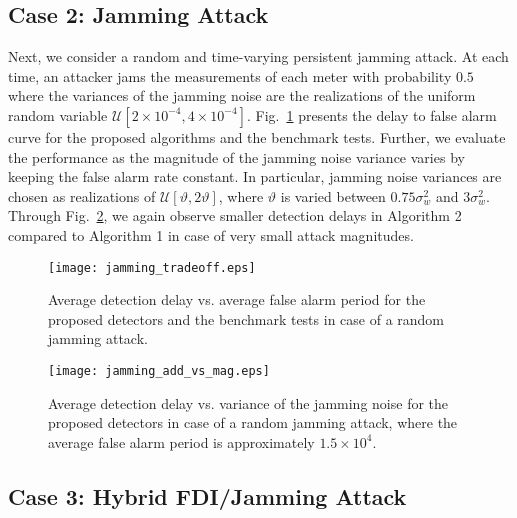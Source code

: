 \documentclass[onecolumn]{IEEEtran}
\begin{document}
\subsection{Case 2: Jamming Attack} \label{sec:num_jam}

Next, we consider a random and time-varying persistent jamming attack. At each time, an attacker jams the measurements of each meter with probability $0.5$ where the variances of the jamming noise are the realizations of the uniform random variable $\mathcal{U}[2\times10^{-4},4\times10^{-4}]$. Fig.~\ref{fig:jamming_tradeoff} presents the delay to false alarm curve for the proposed algorithms and the benchmark tests. Further, we evaluate the performance as the magnitude of the jamming noise variance varies by keeping the false alarm rate constant. In particular, jamming noise variances are chosen as realizations of $\mathcal{U}[\vartheta,2 \vartheta]$, where $\vartheta$ is varied between $0.75 \sigma_w^2$ and $3 \sigma_w^2$. Through Fig.~\ref{fig:jamming_add_vs_mag}, we again observe smaller detection delays in Algorithm 2 compared to Algorithm 1 in case of very small attack magnitudes.

\begin{figure}
\center
  \texttt{[image: jamming\_tradeoff.eps]}
\caption{Average detection delay vs. average false alarm period for the proposed detectors and the benchmark tests in case of a random jamming attack.}
 \label{fig:jamming_tradeoff}
\end{figure}

\begin{figure}
\center
  \texttt{[image: jamming\_add\_vs\_mag.eps]}
  \vspace{-0.1cm}
\caption{Average detection delay vs. variance of the jamming noise for the proposed detectors in case of a random jamming attack, where the average false alarm period is approximately $1.5\times10^{4}$.}
 \label{fig:jamming_add_vs_mag}
\end{figure}


\subsection{Case 3: Hybrid FDI/Jamming Attack} \label{sec:num_combined}
\end{document}
